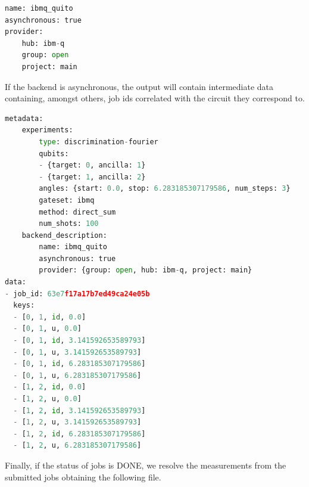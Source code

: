 \documentclass[preprint,12pt, a4paper, dvipsnames]{elsarticle}
\newcommand{\1}{{\rm 1\hspace{-0.9mm}l}}
\theoremstyle{definition}
\begin{document}
\begin{lstlisting}[language=Python, caption=Backend file]
name: ibmq_quito
asynchronous: true
provider:
	hub: ibm-q
	group: open
	project: main

\end{lstlisting}
If the backend is asynchronous, the output will contain intermediate data
containing, amongst others, job ids correlated with the circuit they
correspond to.

\begin{lstlisting}[language=Python, caption=Resolved results]
metadata:
	experiments:
		type: discrimination-fourier
		qubits:
		- {target: 0, ancilla: 1}
		- {target: 1, ancilla: 2}
		angles: {start: 0.0, stop: 6.283185307179586, num_steps: 3}
		gateset: ibmq
		method: direct_sum
		num_shots: 100
	backend_description:
		name: ibmq_quito
		asynchronous: true
		provider: {group: open, hub: ibm-q, project: main}
data:
- job_id: 63e7f17a17b7ed49ca24e05b
  keys:
  - [0, 1, id, 0.0]
  - [0, 1, u, 0.0]
  - [0, 1, id, 3.141592653589793]
  - [0, 1, u, 3.141592653589793]
  - [0, 1, id, 6.283185307179586]
  - [0, 1, u, 6.283185307179586]
  - [1, 2, id, 0.0]
  - [1, 2, u, 0.0]
  - [1, 2, id, 3.141592653589793]
  - [1, 2, u, 3.141592653589793]
  - [1, 2, id, 6.283185307179586]
  - [1, 2, u, 6.283185307179586]

\end{lstlisting}
Finally, if the status of jobs is DONE, we resolve the measurements from the
submitted jobs obtaining the following file.
\end{document}

